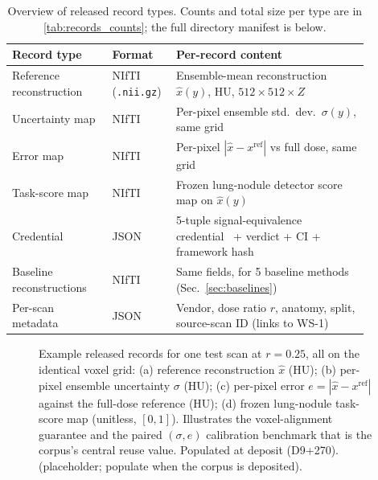 \documentclass{article}
\newcommand{\todo}[1]{\textcolor{red}{\textbf{[TODO: #1]}}}
\newcommand{\todoFigure}[2]{%
  \begin{figure}[ht]\centering%
    \fbox{\parbox{0.85\linewidth}{\centering\todo{FIGURE: #2}}}%
    \caption{#2 (placeholder; populate when the corpus is deposited).}\label{#1}%
  \end{figure}}
\begin{document}
\begin{table}[h]
    \centering
    \small
    \begin{tabular}{p{0.26\linewidth}p{0.12\linewidth}p{0.50\linewidth}}
        \toprule
        \textbf{Record type} & \textbf{Format} & \textbf{Per-record content} \\
        \midrule
        Reference reconstruction & NIfTI (\texttt{.nii.gz}) & Ensemble-mean reconstruction $\hat{x}(y)$, HU, $512\times512\times Z$ \\
        Uncertainty map & NIfTI & Per-pixel ensemble std.\ dev.\ $\sigma(y)$, same grid \\
        Error map & NIfTI & Per-pixel $|{\hat{x}-x^{\textrm{ref}}}|$ vs full dose, same grid \\
        Task-score map & NIfTI & Frozen lung-nodule detector score map on $\hat{x}(y)$ \\
        Credential & JSON & 5-tuple signal-equivalence credential~\citep{ws2framework} + verdict + CI + framework hash \\
        Baseline reconstructions & NIfTI & Same fields, for 5 baseline methods (Sec.~\ref{sec:baselines}) \\
        Per-scan metadata & JSON & Vendor, dose ratio $r$, anatomy, split, source-scan ID (links to WS-1) \\
        \bottomrule
    \end{tabular}
    \caption{Overview of released record types. Counts and total size per
    type are in \autoref{tab:records_counts}; the full directory manifest
    is below.}
    \label{tab:records_overview}
\end{table}

\todoFigure{fig:example_records}{Example released records for one test scan at
$r = 0.25$, all on the identical voxel grid: (a) reference reconstruction
$\hat{x}$ (HU); (b) per-pixel ensemble uncertainty $\sigma$ (HU); (c) per-pixel
error $e = |\hat{x} - x^{\textrm{ref}}|$ against the full-dose reference (HU);
(d) frozen lung-nodule task-score map (unitless, $[0,1]$). Illustrates the
voxel-alignment guarantee and the paired $(\sigma, e)$ calibration benchmark
that is the corpus's central reuse value. Populated at deposit (D9+270).}
\end{document}
